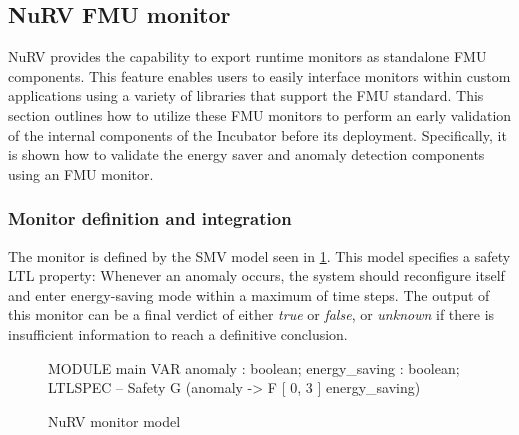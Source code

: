 \subsection{NuRV FMU monitor}\label{subsec:NuRVmoni}
NuRV provides the capability to export runtime monitors as standalone FMU components. This feature enables users to easily interface monitors within custom applications using a variety of libraries that support the FMU standard.
This section outlines how to utilize these FMU monitors to perform an early validation of the internal components of the Incubator before its deployment. Specifically, it is shown how to validate the energy saver and anomaly detection components using an FMU monitor.

\subsubsection{Monitor definition and integration}
The monitor is defined by the SMV model seen in \cref{fig:nurv_orbit_spec}. This model specifies a safety LTL property: Whenever an anomaly occurs, the system should reconfigure itself and enter energy-saving mode within a maximum of  time steps. The output of this monitor can be a final verdict of either \textit{true} or \textit{false}, or \textit{unknown} if there is insufficient information to reach a definitive conclusion.

\begin{figure}[ht]
	\begin{textcode}
		MODULE main
		VAR
			anomaly : boolean;
			energy_saving : boolean;
		LTLSPEC -- Safety
			G (anomaly -> F [ 0, 3 ] energy_saving)
	\end{textcode}
	\caption{NuRV monitor model}
	\label{fig:nurv_orbit_spec}
\end{figure}%

